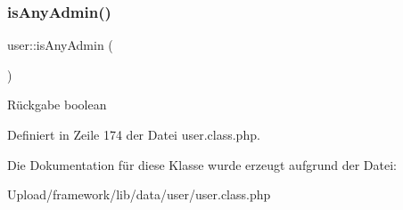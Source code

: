\mbox{\label{classuser_a1f80a843c329ca4494043ef41f81f324}} 
\subsubsection{\texorpdfstring{is\+Any\+Admin()}{isAnyAdmin()}}
{\footnotesize\ttfamily user\+::is\+Any\+Admin (\begin{DoxyParamCaption}{ }\end{DoxyParamCaption})}

\begin{DoxyReturn}{Rückgabe}
boolean 
\end{DoxyReturn}


Definiert in Zeile 174 der Datei user.\+class.\+php.



Die Dokumentation für diese Klasse wurde erzeugt aufgrund der Datei\+:\begin{DoxyCompactItemize}
\item 
Upload/framework/lib/data/user/user.\+class.\+php\end{DoxyCompactItemize}
